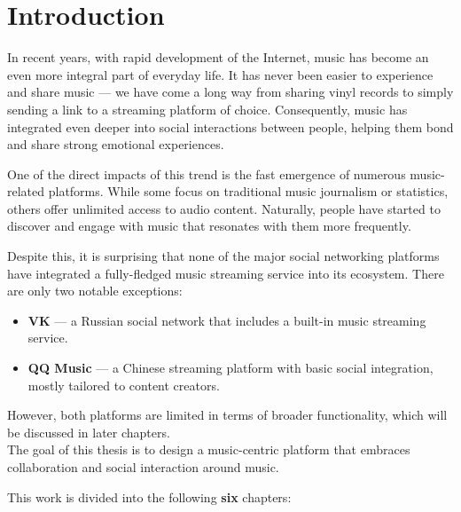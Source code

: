 \chapter{Introduction}\label{chap:intro}


In recent years, with rapid development of the Internet,
music has become an even more integral part of everyday life.\cite{music_role_life}
It has never been easier to experience and share music — we have come
a long way from sharing vinyl records to simply sending a link to a streaming platform of choice.
Consequently, music has integrated even deeper into social interactions between people,
helping them bond and share strong emotional experiences.\cite{music_role_life}

One of the direct impacts of this trend is the fast emergence of numerous music-related platforms.
While some focus on traditional music journalism or statistics, others offer unlimited access to audio content.
Naturally, people have started to discover and engage with music that resonates with them more frequently.\cite{music_role_life}

Despite this, it is surprising that none of the major social networking platforms have integrated
a fully-fledged music streaming service into its ecosystem.
There are only two notable exceptions:

\begin{itemize}
    \item \textbf{VK} — a Russian social network that includes a built-in music streaming service.\cite{vk}
    \item \textbf{QQ Music} — a Chinese streaming platform with basic social integration, mostly tailored to content creators.
\end{itemize}

However, both platforms are limited in terms of broader functionality, which will be discussed in later chapters.\\

The goal of this thesis is to design a music-centric platform that embraces
collaboration and social interaction around music.

This work is divided into the following \textbf{six} chapters:

